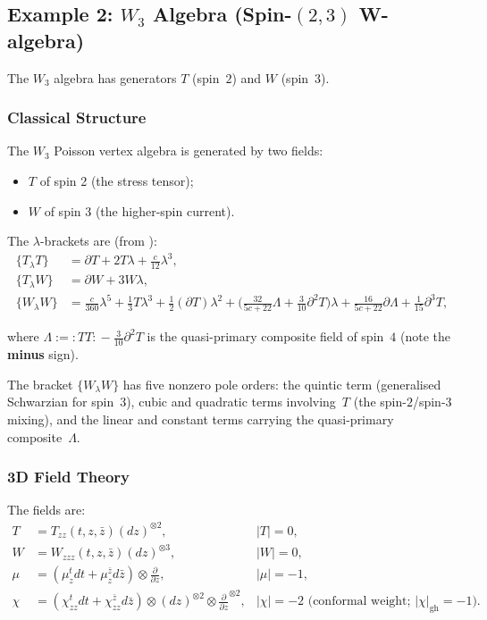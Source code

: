 \subsection{Example 2: $W_3$ Algebra (Spin-$(2,3)$ W-algebra)}
\label{subsec:W3}

The $W_3$ algebra has generators $T$ (spin~$2$) and $W$ (spin~$3$).

\subsubsection{Classical Structure}

The $W_3$ Poisson vertex algebra is generated by two fields:
\begin{itemize}
\item $T$ of spin 2 (the stress tensor);
\item $W$ of spin 3 (the higher-spin current).
\end{itemize}

The $\lambda$-brackets are (from \cite{KZ25}):
\begin{align}
\label{eq:w3-lambda-TT}
\{T_\lambda T\} &= \partial T + 2T\lambda + \frac{c}{12}\lambda^3,\\
\label{eq:w3-lambda-TW}
\{T_\lambda W\} &= \partial W + 3W\lambda,\\
\label{eq:w3-lambda-WW}
\{W_\lambda W\} &= \frac{c}{360}\lambda^5 + \frac{1}{3}T\lambda^3 + \frac{1}{2}(\partial T)\lambda^2 + \biggl(\frac{32}{5c + 22}\Lambda + \frac{3}{10}\partial^2 T\biggr)\lambda + \frac{16}{5c + 22}\partial\Lambda + \frac{1}{15}\partial^3 T,
\end{align}

\noindent
where $\Lambda := {:\!TT\!:} - \tfrac{3}{10}\partial^2 T$ is the quasi-primary composite field of spin~$4$ (note the \textbf{minus} sign).

\begin{remark}
The bracket $\{W_\lambda W\}$ has five nonzero pole orders:
the quintic term (generalised Schwarzian for spin~$3$),
cubic and quadratic terms involving~$T$
(the spin-$2$/spin-$3$ mixing),
and the linear and constant terms carrying
the quasi-primary composite~$\Lambda$.
\end{remark}

\subsubsection{3D Field Theory}

The fields are:
\begin{align}
T &= T_{zz}(t,z,\bar{z}) (dz)^{\otimes 2}, & |T| = 0,\\
W &= W_{zzz}(t,z,\bar{z}) (dz)^{\otimes 3}, & |W| = 0,\\
\mu &= (\mu^t_z dt + \mu^{\bar{z}}_z d\bar{z}) \otimes \frac{\partial}{\partial z}, & |\mu| = -1,\\
\chi &= (\chi^t_{zz} dt + \chi^{\bar{z}}_{zz} d\bar{z}) \otimes (dz)^{\otimes 2} \otimes \frac{\partial}{\partial z}^{\otimes 2}, & |\chi| = -2\text{ (conformal weight; }|\chi|_{\mathrm{gh}} = -1\text{)}.
\end{align}

